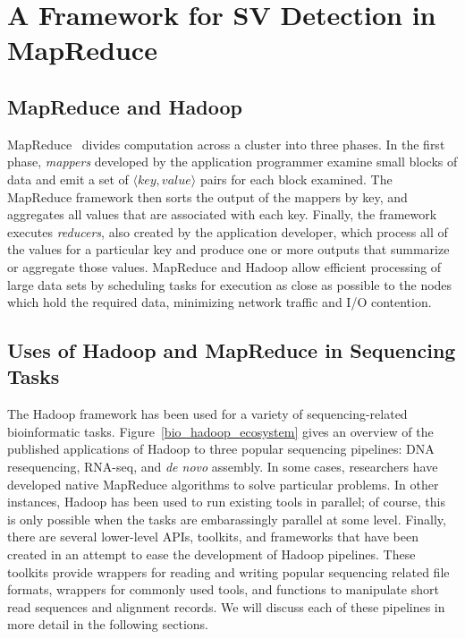 \chapter{A Framework for SV Detection in MapReduce}\label{chap_framework}

\section{MapReduce and Hadoop}\label{section_hadoop_description}

MapReduce~\cite{Dean:2008p277} divides computation across a cluster into three phases. In the first phase, \emph{mappers} developed by the application programmer examine small blocks of data and emit a set of $\langle key, value \rangle$ pairs for each block examined. The MapReduce framework then sorts the output of the mappers by key, and aggregates all values that are associated with each key. Finally, the framework executes \emph{reducers}, also created by the application developer, which process all of the values for a particular key and produce one or more outputs that summarize or aggregate those values. MapReduce and Hadoop allow efficient processing of large data sets by scheduling tasks for execution as close as possible to the nodes which hold the required data, minimizing network traffic and I/O contention.

\section{Uses of Hadoop and MapReduce in Sequencing Tasks}

The Hadoop framework has been used for a variety of sequencing-related bioinformatic tasks. Figure~\ref{bio_hadoop_ecosystem} gives an overview of the published applications of Hadoop to three popular sequencing pipelines: DNA resequencing, RNA-seq, and \emph{de novo} assembly. In some cases, researchers have developed native MapReduce algorithms to solve particular problems. In other instances, Hadoop has been used to run existing tools in parallel; of course, this is only possible when the tasks are embarassingly parallel at some level. Finally, there are several lower-level APIs, toolkits, and frameworks that have been created in an attempt to ease the development of Hadoop pipelines. These toolkits provide wrappers for reading and writing popular sequencing related file formats, wrappers for commonly used tools, and functions to manipulate short read sequences and alignment records. We will discuss each of these pipelines in more detail in the following sections.

